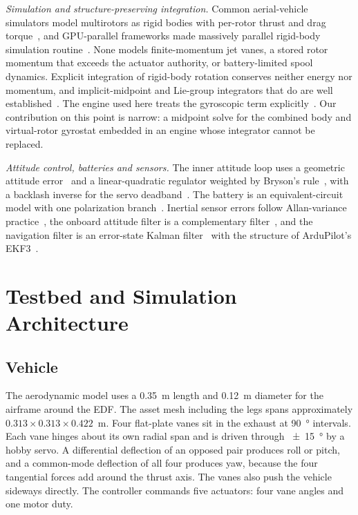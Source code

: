 \documentclass[10pt,letterpaper]{article}
\begin{document}
\textit{Simulation and structure-preserving integration.}
Common aerial-vehicle simulators model multirotors as rigid bodies with per-rotor thrust and drag torque~\cite{furrer2016rotors,song2020flightmare,shah2018airsim,panerati2021gym}, and GPU-parallel frameworks made massively parallel rigid-body simulation routine~\cite{makoviychuk2021isaac,mittal2023orbit}.
None models finite-momentum jet vanes, a stored rotor momentum that exceeds the actuator authority, or battery-limited spool dynamics.
Explicit integration of rigid-body rotation conserves neither energy nor momentum, and implicit-midpoint and Lie-group integrators that do are well established~\cite{simo1991,hairer2006,lee2007lie}.
The engine used here treats the gyroscopic term explicitly~\cite{physx2023}.
Our contribution on this point is narrow: a midpoint solve for the combined body and virtual-rotor gyrostat embedded in an engine whose integrator cannot be replaced.

\textit{Attitude control, batteries and sensors.}
The inner attitude loop uses a geometric attitude error~\cite{lee2010geometric} and a linear-quadratic regulator weighted by Bryson's rule~\cite{bryson1975}, with a backlash inverse for the servo deadband~\cite{tao1996}.
The battery is an equivalent-circuit model with one polarization branch~\cite{chen2006battery,plett2015}.
Inertial sensor errors follow Allan-variance practice~\cite{elsheimy2008allan}, the onboard attitude filter is a complementary filter~\cite{mahony2008}, and the navigation filter is an error-state Kalman filter~\cite{sola2017} with the structure of ArduPilot's EKF3~\cite{ardupilot2026ekf3}.

\section{Testbed and Simulation Architecture}
\label{sec:system}

\subsection{Vehicle}

The aerodynamic model uses a \SI{0.35}{\metre} length and \SI{0.12}{\metre} diameter for the airframe around the EDF. The asset mesh including the legs spans approximately $0.313 \times 0.313 \times 0.422$~\si{\metre}.
Four flat-plate vanes sit in the exhaust at \SI{90}{\degree} intervals.
Each vane hinges about its own radial span and is driven through \SI{\pm15}{\degree} by a hobby servo.
A differential deflection of an opposed pair produces roll or pitch, and a common-mode deflection of all four produces yaw, because the four tangential forces add around the thrust axis.
The vanes also push the vehicle sideways directly.
The controller commands five actuators: four vane angles and one motor duty.
\end{document}
